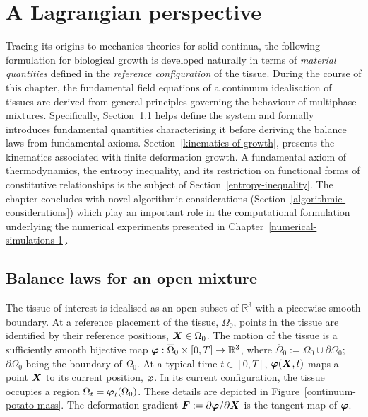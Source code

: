 \chapter{A Lagrangian perspective}
\label{lagrangian-perspective}

Tracing its origins to mechanics theories for solid continua, the
following formulation for biological growth is developed naturally in
terms of {\em material quantities} defined in the {\em reference
  configuration} of the tissue. During the course of this chapter, the
fundamental field equations of a continuum idealisation of tissues are
derived from general principles governing the behaviour of multiphase
mixtures. Specifically, Section~\ref{balance-laws} helps define the
system and formally introduces fundamental quantities characterising
it before deriving the balance laws from fundamental
axioms. Section~\ref{kinematics-of-growth}, presents the kinematics
associated with finite deformation growth. A fundamental axiom of
thermodynamics, the entropy inequality, and its restriction on
functional forms of constitutive relationships is the subject of
Section~\ref{entropy-inequality}. The chapter concludes with novel
algorithmic considerations (Section~\ref{algorithmic-considerations})
which play an important role in the computational formulation
underlying the numerical experiments presented in
Chapter~\ref{numerical-simulations-1}.

\section{Balance laws for an open mixture}
\label{balance-laws}

The tissue of interest is idealised as an open subset of
$\mathbb{R}^3$ with a piecewise smooth boundary. At a reference
placement of the tissue, $\Omega_0$, points in the tissue are
identified by their reference positions, $\mbox{\boldmath$ X$} \in \Omega_0$. The
motion of the tissue is a sufficiently smooth bijective map $\mbox{\boldmath$\varphi$}:
\overline{\Omega}_0 \times [0,T] \rightarrow \mathbb{R}^3$, where
$\overline{\Omega}_0 := \Omega_0 \cup \partial\Omega_0$;
$\partial\Omega_0$ being the boundary of $\Omega_0$. At a typical time
$t \in [0,T]$, $\mbox{\boldmath$\varphi$}(\mbox{\boldmath$ X$},t)$ maps a point $\mbox{\boldmath$ X$}$ to its current
position, $\mbox{\boldmath$ x$}$. In its current configuration, the tissue occupies a
region $\Omega_t = \mbox{\boldmath$\varphi$}_t (\Omega_0)$. These details are depicted
in Figure~\ref{continuum-potato-mass}. The deformation gradient $\mbox{\boldmath$ F$}
:= \partial \mbox{\boldmath$\varphi$}/ \partial\mbox{\boldmath$ X$}$ is the tangent map of $\mbox{\boldmath$\varphi$}$.

